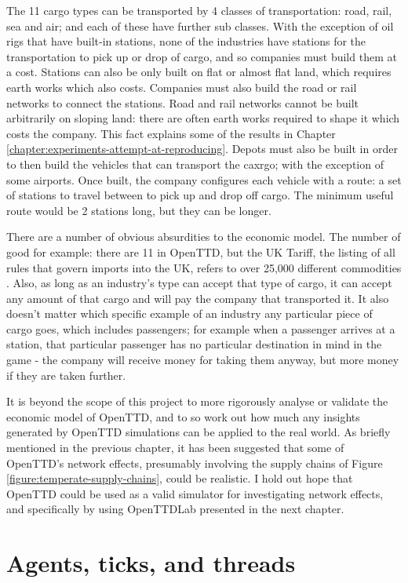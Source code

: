 \documentclass[logo,msc,dsti]{style/infthesis}    %
\begin{document}
{The 11 cargo types can be transported by 4 classes of transportation: road, rail, sea and air; and each of these have further sub classes. With the exception of oil rigs that have built-in stations, none of the industries have stations for the transportation to pick up or drop of cargo, and so companies must build them at a cost. Stations can also be only built on flat or almost flat land, which requires earth works which also costs. Companies must also build the road or rail networks to connect the stations. Road and rail networks cannot be built arbitrarily on sloping land: there are often earth works required to shape it which costs the company. This fact explains some of the results in Chapter \ref{chapter:experiments-attempt-at-reproducing}. Depots must also be built in order to then build the vehicles that can transport the caxrgo; with the exception of some airports. Once built, the company configures each vehicle with a route: a set of stations to travel between to pick up and drop off cargo. The minimum useful route would be 2 stations long, but they can be longer.

There are a number of obvious absurdities to the economic model. The number of good for example: there are 11 in OpenTTD, but the UK Tariff, the listing of all rules that govern imports into the UK, refers to over 25,000 different commodities \cite{uktariff}. Also, as long as an industry's type can accept that type of cargo, it can accept any amount of that cargo and will pay the company that transported it. It also doesn't matter which specific example of an industry any particular piece of cargo goes, which includes passengers; for example when a passenger arrives at a station, that particular passenger has no particular destination in mind in the game - the company will receive money for taking them anyway, but more money if they are taken further.

It is beyond the scope of this project to more rigorously analyse or validate the economic model of OpenTTD, and to so work out how much any insights generated by OpenTTD simulations can be applied to the real world. As briefly mentioned in the previous chapter, it has been suggested that some of OpenTTD's network effects, presumably involving the supply chains of Figure \ref{figure:temperate-supply-chains}, could be realistic. I hold out hope that OpenTTD could be used as a valid simulator for investigating network effects, and specifically by using OpenTTDLab presented in the next chapter.

\section{Agents, ticks, and threads}

}
\end{document}
